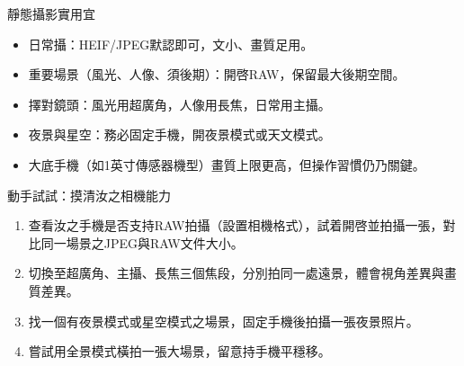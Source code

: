 \begin{tcbinfo}{靜態攝影實用宜}
\begin{itemize}
  \item 日常攝：HEIF/JPEG默認即可，文小、畫質足用。
  \item 重要場景（風光、人像、須後期）：開啓RAW，保留最大後期空間。
  \item 擇對鏡頭：風光用超廣角，人像用長焦，日常用主攝。
  \item 夜景與星空：務必固定手機，開夜景模式或天文模式。
  \item 大底手機（如1英寸傳感器機型）畫質上限更高，但操作習慣仍乃關鍵。
\end{itemize}

\end{tcbinfo}

\begin{tcbpractice}{動手試試：摸清汝之相機能力}
\begin{enumerate}
  \item 查看汝之手機是否支持RAW拍攝（設置相機格式），試着開啓並拍攝一張，對比同一場景之JPEG與RAW文件大小。
  \item 切換至超廣角、主攝、長焦三個焦段，分別拍同一處遠景，體會視角差異與畫質差異。
  \item 找一個有夜景模式或星空模式之場景，固定手機後拍攝一張夜景照片。
  \item 嘗試用全景模式橫拍一張大場景，留意持手機平穩移。
\end{enumerate}

\end{tcbpractice}
